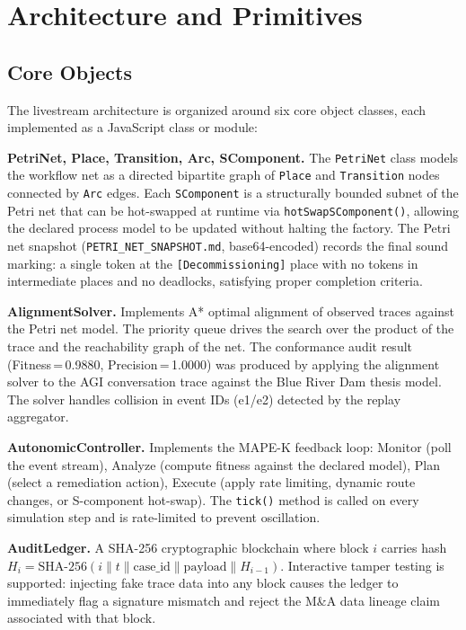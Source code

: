 
\section{Architecture and Primitives}
\label{sec:livestream-arch}

\subsection{Core Objects}
\label{sec:livestream-arch-objects}

The livestream architecture is organized around six core object classes, each
implemented as a JavaScript class or module:

\textbf{PetriNet, Place, Transition, Arc, SComponent.} The \texttt{PetriNet} class
models the workflow net as a directed bipartite graph of \texttt{Place} and
\texttt{Transition} nodes connected by \texttt{Arc} edges. Each \texttt{SComponent}
is a structurally bounded subnet of the Petri net that can be hot-swapped at runtime
via \texttt{hotSwapSComponent()}, allowing the declared process model to be updated
without halting the factory. The Petri net snapshot (\texttt{PETRI\_NET\_SNAPSHOT.md},
base64-encoded) records the final sound marking: a single token at the
\texttt{[Decommissioning]} place with no tokens in intermediate places and no
deadlocks, satisfying proper completion criteria.

\textbf{AlignmentSolver.} Implements A* optimal alignment of observed traces against
the Petri net model. The priority queue drives the search over the product of the
trace and the reachability graph of the net. The conformance audit result
(Fitness\,=\,0.9880, Precision\,=\,1.0000) was produced by applying the alignment
solver to the AGI conversation trace against the Blue River Dam thesis model. The
solver handles collision in event IDs (e1/e2) detected by the replay aggregator.

\textbf{AutonomicController.} Implements the MAPE-K feedback loop: Monitor (poll
the event stream), Analyze (compute fitness against the declared model), Plan
(select a remediation action), Execute (apply rate limiting, dynamic route changes,
or S-component hot-swap). The \texttt{tick()} method is called on every simulation
step and is rate-limited to prevent oscillation.

\textbf{AuditLedger.} A SHA-256 cryptographic blockchain where block $i$ carries
hash $H_i = \text{SHA-256}(i \| t \| \text{case\_id} \| \text{payload} \| H_{i-1})$.
Interactive tamper testing is supported: injecting fake trace data into any block
causes the ledger to immediately flag a signature mismatch and reject the M\&A data
lineage claim associated with that block.

